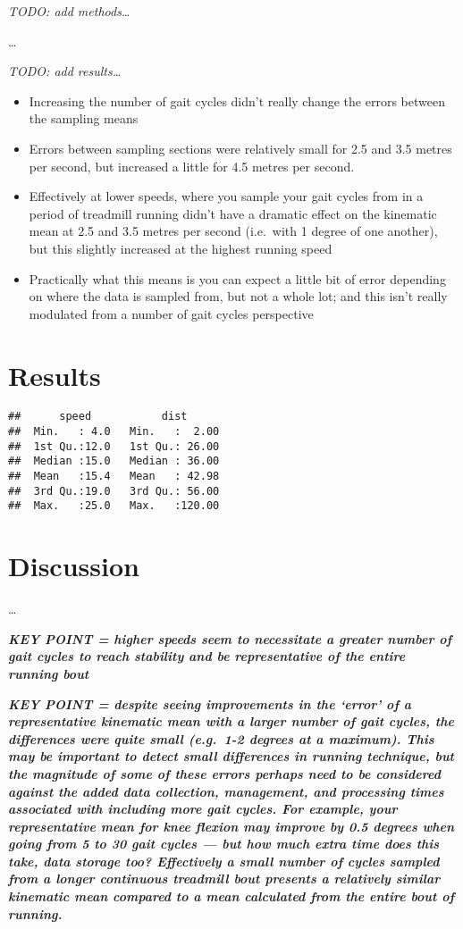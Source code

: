 \documentclass[]{elsarticle} %
\providecommand{\tightlist}{%
  \setlength{\itemsep}{0pt}\setlength{\parskip}{0pt}}
\begin{document}
\emph{TODO: add methods\ldots{}}

\ldots{}

\emph{TODO: add results\ldots{}}

\begin{itemize}
\tightlist
\item
  Increasing the number of gait cycles didn't really change the errors
  between the sampling means
\item
  Errors between sampling sections were relatively small for 2.5 and 3.5
  metres per second, but increased a little for 4.5 metres per second.
\item
  Effectively at lower speeds, where you sample your gait cycles from in
  a period of treadmill running didn't have a dramatic effect on the
  kinematic mean at 2.5 and 3.5 metres per second (i.e.~with 1 degree of
  one another), but this slightly increased at the highest running speed
\item
  Practically what this means is you can expect a little bit of error
  depending on where the data is sampled from, but not a whole lot; and
  this isn't really modulated from a number of gait cycles perspective
\end{itemize}

\hypertarget{results}{%
\section{Results}\label{results}}

\begin{verbatim}
##      speed           dist       
##  Min.   : 4.0   Min.   :  2.00  
##  1st Qu.:12.0   1st Qu.: 26.00  
##  Median :15.0   Median : 36.00  
##  Mean   :15.4   Mean   : 42.98  
##  3rd Qu.:19.0   3rd Qu.: 56.00  
##  Max.   :25.0   Max.   :120.00
\end{verbatim}

\hypertarget{discussion}{%
\section{Discussion}\label{discussion}}

\ldots{}

\textbf{\emph{KEY POINT = higher speeds seem to necessitate a greater
number of gait cycles to reach stability and be representative of the
entire running bout}}

\textbf{\emph{KEY POINT = despite seeing improvements in the `error' of
a representative kinematic mean with a larger number of gait cycles, the
differences were quite small (e.g.~1-2 degrees at a maximum). This may
be important to detect small differences in running technique, but the
magnitude of some of these errors perhaps need to be considered against
the added data collection, management, and processing times associated
with including more gait cycles. For example, your representative mean
for knee flexion may improve by 0.5 degrees when going from 5 to 30 gait
cycles --- but how much extra time does this take, data storage too?
Effectively a small number of cycles sampled from a longer continuous
treadmill bout presents a relatively similar kinematic mean compared to
a mean calculated from the entire bout of running.}}
\end{document}
